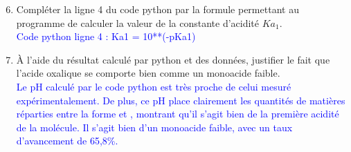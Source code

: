 \documentclass[a4paper,11pt]{article}
\begin{document}
\begin{enumerate}
\setcounter{enumi}{5}
    \item Compléter la ligne 4 du code python par la formule permettant au programme de calculer la valeur de la constante d'acidité $Ka_1$.\\
    \textcolor{blue}{Code python ligne 4 : Ka1 = 10**(-pKa1)}
    \item À l'aide du résultat calculé par python et des données, justifier le fait que l'acide oxalique se comporte bien comme un monoacide faible.\\
    \textcolor{blue}{Le pH calculé par le code python est très proche de celui mesuré expérimentalement. De plus, ce pH place clairement les quantités de matières réparties entre la forme  et , montrant qu'il s'agit bien de la première acidité de la molécule. Il s'agit bien d'un monoacide faible, avec un taux d'avancement de 65,8\unit{\percent}. }
\end{enumerate}
\end{document}
